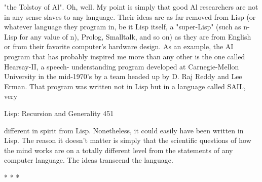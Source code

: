 "the Tolstoy of Al". Oh, well. My point is simply that good Al researchers are not in
any sense slaves to any language. Their ideas are as far removed from Lisp (or
whatever language they program in, be it Lisp itself, a "super-Lisp" (such as n-Lisp
for any value of n), Prolog, Smalltalk, and so on) as they are from English or from
their favorite computer's hardware design. As an example, the AI program that has
probably inspired me more than any other is the one called Hearsay-II, a speech-
understanding program developed at Carnegie-Mellon University in the mid-1970's
by a team headed up by D. Raj Reddy and Lee Erman. That program was written not
in Lisp but in a language called SAIL, very




Lisp: Recursion and Generality                                                       451

different in spirit from Lisp. Nonetheless, it could easily have been written in Lisp.
The reason it doesn't matter is simply that the scientific questions of how the mind
works are on a totally different level from the statements of any computer language.
The ideas transcend the language.

                                        *   *   *

